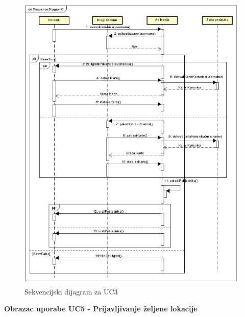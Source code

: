 		\begin{figure}[H]
			\includegraphics[width=\textwidth]{slike/SeqUC3.png} %
			\caption{Sekvencijski dijagram za UC3}
			\label{fig:promjene4} %
		\end{figure}
\pagebreak

\noindent \textbf{Obrazac uporabe UC5 - Prijavljivanje željene lokacije}
    
